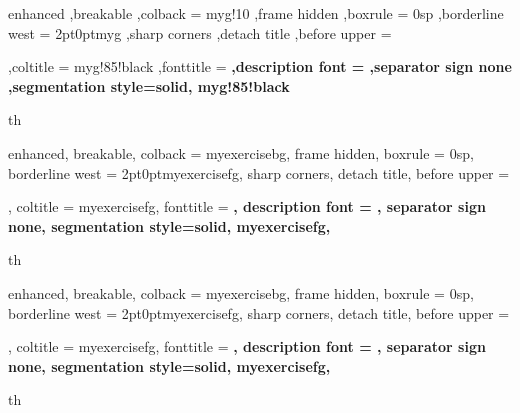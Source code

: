 %
%
%


{%
	enhanced
	,breakable
	,colback = myg!10
	,frame hidden
	,boxrule = 0sp
	,borderline west = {2pt}{0pt}{myg}
	,sharp corners
	,detach title
	,before upper = \tcbtitle\par\smallskip
	,coltitle = myg!85!black
	,fonttitle = \bfseries\sffamily
	,description font = \mdseries
	,separator sign none
	,segmentation style={solid, myg!85!black}
}
{th}




{%
	enhanced,
	breakable,
	colback = myexercisebg,
	frame hidden,
	boxrule = 0sp,
	borderline west = {2pt}{0pt}{myexercisefg},
	sharp corners,
	detach title,
	before upper = \tcbtitle\par\smallskip,
	coltitle = myexercisefg,
	fonttitle = \bfseries\sffamily,
	description font = \mdseries,
	separator sign none,
	segmentation style={solid, myexercisefg},
}
{th}

{%
	enhanced,
	breakable,
	colback = myexercisebg,
	frame hidden,
	boxrule = 0sp,
	borderline west = {2pt}{0pt}{myexercisefg},
	sharp corners,
	detach title,
	before upper = \tcbtitle\par\smallskip,
	coltitle = myexercisefg,
	fonttitle = \bfseries\sffamily,
	description font = \mdseries,
	separator sign none,
	segmentation style={solid, myexercisefg},
}
{th}


